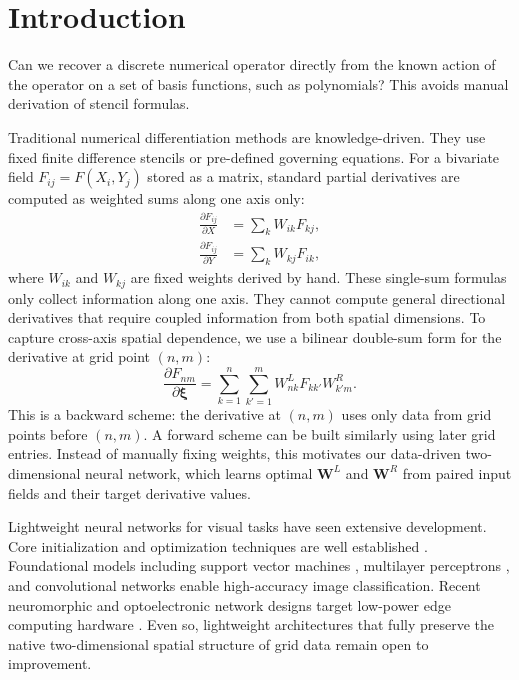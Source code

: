 \documentclass[pdflatex,sn-mathphys-num]{sn-jnl}%
\theoremstyle{thmstyleone}%
\theoremstyle{thmstyletwo}%
\theoremstyle{thmstylethree}%
\begin{document}



\maketitle

\section{Introduction}
Can we recover a discrete numerical operator directly from the known action of the operator on a set of basis functions, such as polynomials? This avoids manual derivation of stencil formulas.

Traditional numerical differentiation methods are knowledge-driven. They use fixed finite difference stencils or pre-defined governing equations. For a bivariate field $F_{ij}=F(X_i,Y_j)$ stored as a matrix, standard partial derivatives are computed as weighted sums along one axis only:
\begin{align}
\frac{\partial F_{ij}}{\partial X} &= \sum_{k} W_{ik} F_{kj}, \\
\frac{\partial F_{ij}}{\partial Y} &= \sum_{k} W_{kj} F_{ik},
\end{align}
where $W_{ik}$ and $W_{kj}$ are fixed weights derived by hand. These single-sum formulas only collect information along one axis. They cannot compute general directional derivatives that require coupled information from both spatial dimensions. To capture cross-axis spatial dependence, we use a bilinear double-sum form for the derivative at grid point $(n,m)$:
\begin{equation}
\frac{\partial F_{nm}}{\partial \boldsymbol{\xi}} = \sum_{k=1}^n\sum_{k'=1}^m W_{{n}k}^{L} F_{kk'} W_{k'{m}}^{R}.
\end{equation}
This is a backward scheme: the derivative at $(n,m)$ uses only data from grid points before $(n,m)$. A forward scheme can be built similarly using later grid entries. Instead of manually fixing weights, this motivates our data-driven two-dimensional neural network, which learns optimal $\boldsymbol{W}^{L}$ and $\boldsymbol{W}^{R}$ from paired input fields and their target derivative values.

Lightweight neural networks for visual tasks have seen extensive development. Core initialization and optimization techniques are well established \cite{xavier_glorot, heavy_init, kingma2014adam}. Foundational models including support vector machines \cite{Cortes1995}, multilayer perceptrons \cite{Rumelhart1986}, and convolutional networks \cite{Lecun1998, Krizhevsky2012} enable high-accuracy image classification. Recent neuromorphic and optoelectronic network designs target low-power edge computing hardware \cite{Li2023, Beyeler2013, Song2024}. Even so, lightweight architectures that fully preserve the native two-dimensional spatial structure of grid data remain open to improvement.
\end{document}
